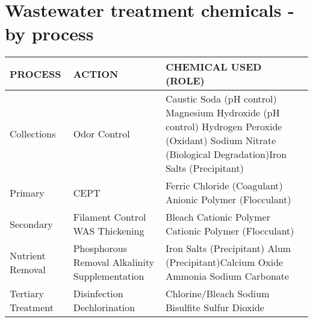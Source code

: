 \newpage
\section{Wastewater treatment chemicals - by process}
\begin{tabular}{ |p{4cm}|p{4.5cm}|p{6.5cm}|  }
\hline

\hspace{1 cm}PROCESS & \hspace{1.2 cm} ACTION & \hspace{1.2 cm} CHEMICAL USED (ROLE) \\
\hline
Collections & Odor Control & Caustic Soda (pH control) \newline Magnesium Hydroxide (pH control) \newline Hydrogen Peroxide (Oxidant) \newline Sodium Nitrate (Biological Degradation)\newline Iron Salts (Precipitant)\\
\hline
Primary & CEPT & Ferric Chloride (Coagulant) \newline Anionic Polymer (Flocculant) \\
\hline
Secondary    &Filament Control \newline \textsf{} \newline WAS Thickening & Bleach \newline Cationic Polymer \newline Cationic Polymer (Flocculant)\\
\hline
Nutrient Removal & Phosphorous Removal \newline \textsl{} \newline
Alkalinity Supplementation & Iron Salts (Precipitant) \newline Alum (Precipitant)\newline Calcium Oxide \newline Ammonia \newline Sodium Carbonate \\
\hline
Tertiary Treatment & Disinfection  \newline 
Dechlorination & Chlorine/Bleach \newline Sodium Bisulfite  \newline Sulfur Dioxide   \\

\end{tabular}

